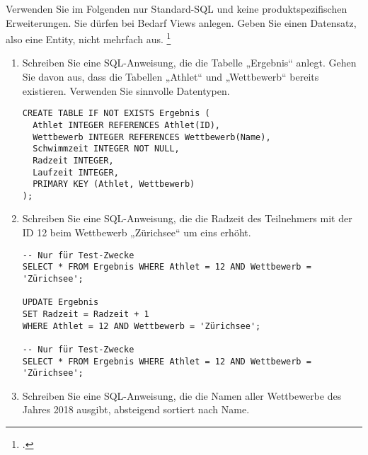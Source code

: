 \documentclass{lehramt-informatik-aufgabe}
\begin{document}
\noindent
Verwenden Sie im Folgenden nur Standard-SQL und keine
produktspezifischen Erweiterungen. Sie dürfen bei Bedarf Views anlegen.
Geben Sie einen Datensatz, also eine Entity, nicht mehrfach aus.
\footcite{examen:66116:2018:09}

\begin{enumerate}


\item Schreiben Sie eine SQL-Anweisung, die die Tabelle „Ergebnis“
anlegt. Gehen Sie davon aus, dass die Tabellen „Athlet“ und
„Wettbewerb“ bereits existieren. Verwenden Sie sinnvolle Datentypen.

\begin{liAntwort}
\begin{verbatim}
CREATE TABLE IF NOT EXISTS Ergebnis (
  Athlet INTEGER REFERENCES Athlet(ID),
  Wettbewerb INTEGER REFERENCES Wettbewerb(Name),
  Schwimmzeit INTEGER NOT NULL,
  Radzeit INTEGER,
  Laufzeit INTEGER,
  PRIMARY KEY (Athlet, Wettbewerb)
);
\end{verbatim}

\end{liAntwort}


\item Schreiben Sie eine SQL-Anweisung, die die Radzeit des Teilnehmers
mit der ID 12 beim Wettbewerb „Zürichsee“ um eins erhöht.

\begin{liAntwort}
\begin{verbatim}
-- Nur für Test-Zwecke
SELECT * FROM Ergebnis WHERE Athlet = 12 AND Wettbewerb = 'Zürichsee';

UPDATE Ergebnis
SET Radzeit = Radzeit + 1
WHERE Athlet = 12 AND Wettbewerb = 'Zürichsee';

-- Nur für Test-Zwecke
SELECT * FROM Ergebnis WHERE Athlet = 12 AND Wettbewerb = 'Zürichsee';
\end{verbatim}
\end{liAntwort}


\item Schreiben Sie eine SQL-Anweisung, die die Namen aller Wettbewerbe
des Jahres 2018 ausgibt, absteigend sortiert nach Name.


\end{enumerate}
\end{document}
